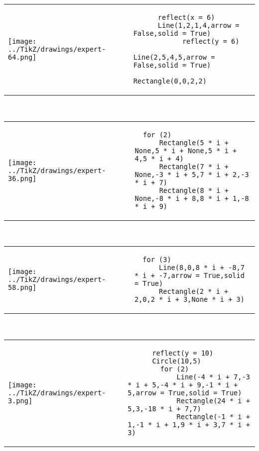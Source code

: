         \begin{tabular}{ll}
\texttt{[image: ../TikZ/drawings/expert-64.png]}&
        \begin{minipage}{10cm}
        \begin{verbatim}
      reflect(x = 6)
      Line(1,2,1,4,arrow = False,solid = True)
            reflect(y = 6)
            Line(2,5,4,5,arrow = False,solid = True)
            Rectangle(0,0,2,2)
        \end{verbatim}
\end{minipage}
\end{tabular}        
        \\

        \begin{tabular}{ll}
\texttt{[image: ../TikZ/drawings/expert-36.png]}&
        \begin{minipage}{10cm}
        \begin{verbatim}
  for (2)
      Rectangle(5 * i + None,5 * i + None,5 * i + 4,5 * i + 4)
      Rectangle(7 * i + None,-3 * i + 5,7 * i + 2,-3 * i + 7)
      Rectangle(8 * i + None,-8 * i + 8,8 * i + 1,-8 * i + 9)
        \end{verbatim}
\end{minipage}
\end{tabular}        
        \\

        \begin{tabular}{ll}
\texttt{[image: ../TikZ/drawings/expert-58.png]}&
        \begin{minipage}{10cm}
        \begin{verbatim}
  for (3)
      Line(8,0,8 * i + -8,7 * i + -7,arrow = True,solid = True)
      Rectangle(2 * i + 2,0,2 * i + 3,None * i + 3)
        \end{verbatim}
\end{minipage}
\end{tabular}        
        \\

        \begin{tabular}{ll}
\texttt{[image: ../TikZ/drawings/expert-3.png]}&
        \begin{minipage}{10cm}
        \begin{verbatim}
      reflect(y = 10)
      Circle(10,5)
        for (2)
            Line(-4 * i + 7,-3 * i + 5,-4 * i + 9,-1 * i + 5,arrow = True,solid = True)
            Rectangle(24 * i + 5,3,-18 * i + 7,7)
            Rectangle(-1 * i + 1,-1 * i + 1,9 * i + 3,7 * i + 3)
        \end{verbatim}
\end{minipage}
\end{tabular}        
        \\

